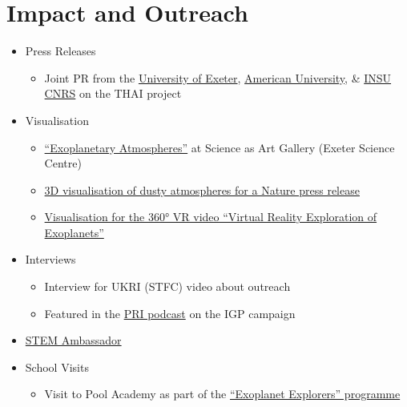 \documentclass[a4paper, 11pt]{article}
\begin{document}
\section{Impact and Outreach}
\begin{itemize}[nosep, leftmargin=10pt]
    \item Press Releases
    \begin{itemize}
        \item Joint PR from the \href{https://www.exeter.ac.uk/research/news/articles/questtouncoverintricacies.html}{University of Exeter}, \href{https://www.american.edu/news/20220811-trappist-1.cfm}{American University}, \& \href{https://www.insu.cnrs.fr/fr/cnrsinfo/la-quete-pour-percer-le-mystere-des-climats-de-planetes-similaires-la-terre-avance}{INSU CNRS} on the THAI project
    \end{itemize}
    \item Visualisation
    \begin{itemize}
        \item \href{https://exetersciencecentre.org/gallery/denis_sergeev_uoe_exoplanets/}{``Exoplanetary Atmospheres''} at Science as Art Gallery (Exeter Science Centre)
        \item \href{https://phys.org/news/2020-06-presence-airborne-signify-habitability-distant.html}{3D visualisation of dusty atmospheres for a Nature press release}
        \item \href{https://youtu.be/Vnke9dWofR8&t=180}{Visualisation for the 360° VR video ``Virtual Reality Exploration of Exoplanets''}
    \end{itemize}
    \item Interviews
    \begin{itemize}
        \item Interview for UKRI (STFC) video about outreach
        \item Featured in the \href{https://theworld.org/stories/2018-08-03/sea-and-sky-scientists-brave-wicked-weather-explore-key-ocean-current}{PRI podcast} on the IGP campaign
    \end{itemize}
    \item \href{https://www.stem.org.uk/stem-ambassadors}{STEM Ambassador}
    \item School Visits
    \begin{itemize}
        \item Visit to Pool Academy as part of the \href{https://physics-astronomy.exeter.ac.uk/exoplanetexplorers/}{``Exoplanet Explorers'' programme}
    \end{itemize}

\end{itemize}
\end{document}
